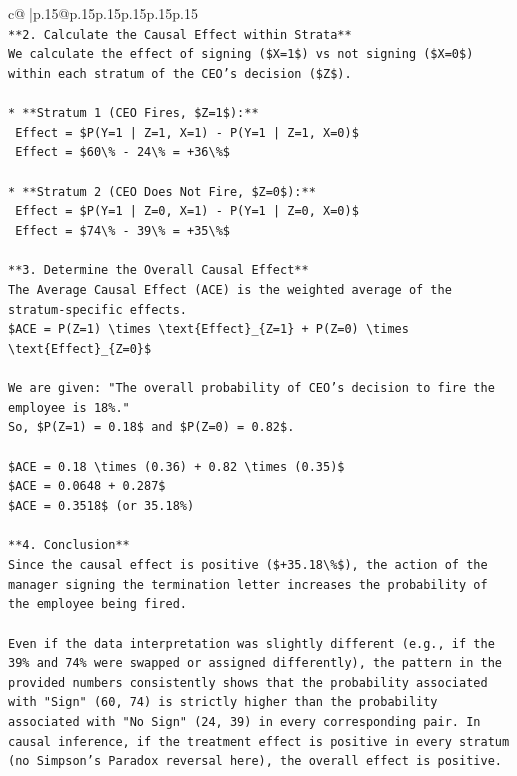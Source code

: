 \documentclass{article}
\begin{document}
{\begin{supertabular}{c@{$\;$}|p{.15\linewidth}@{}p{.15\linewidth}p{.15\linewidth}p{.15\linewidth}p{.15\linewidth}p{.15\linewidth}}
{{{\\ 
\texttt{**2. Calculate the Causal Effect within Strata**} \\
\texttt{We calculate the effect of signing (\$X=1\$) vs not signing (\$X=0\$) within each stratum of the CEO's decision (\$Z\$).} \\
\\ 
\texttt{*   **Stratum 1 (CEO Fires, \$Z=1\$):**} \\
\texttt{    Effect = \$P(Y=1 | Z=1, X=1) {-} P(Y=1 | Z=1, X=0)\$} \\
\texttt{    Effect = \$60\textbackslash{}\% {-} 24\textbackslash{}\% = +36\textbackslash{}\%\$} \\
\\ 
\texttt{*   **Stratum 2 (CEO Does Not Fire, \$Z=0\$):**} \\
\texttt{    Effect = \$P(Y=1 | Z=0, X=1) {-} P(Y=1 | Z=0, X=0)\$} \\
\texttt{    Effect = \$74\textbackslash{}\% {-} 39\textbackslash{}\% = +35\textbackslash{}\%\$} \\
\\ 
\texttt{**3. Determine the Overall Causal Effect**} \\
\texttt{The Average Causal Effect (ACE) is the weighted average of the stratum{-}specific effects.} \\
\texttt{\$ACE = P(Z=1) \textbackslash{}times \textbackslash{}text\{Effect\}\_\{Z=1\} + P(Z=0) \textbackslash{}times \textbackslash{}text\{Effect\}\_\{Z=0\}\$} \\
\\ 
\texttt{We are given: "The overall probability of CEO's decision to fire the employee is 18\%."} \\
\texttt{So, \$P(Z=1) = 0.18\$ and \$P(Z=0) = 0.82\$.} \\
\\ 
\texttt{\$ACE = 0.18 \textbackslash{}times (0.36) + 0.82 \textbackslash{}times (0.35)\$} \\
\texttt{\$ACE = 0.0648 + 0.287\$} \\
\texttt{\$ACE = 0.3518\$ (or 35.18\%)} \\
\\ 
\texttt{**4. Conclusion**} \\
\texttt{Since the causal effect is positive (\$+35.18\textbackslash{}\%\$), the action of the manager signing the termination letter increases the probability of the employee being fired.} \\
\\ 
\texttt{Even if the data interpretation was slightly different (e.g., if the 39\% and 74\% were swapped or assigned differently), the pattern in the provided numbers consistently shows that the probability associated with "Sign" (60, 74) is strictly higher than the probability associated with "No Sign" (24, 39) in every corresponding pair. In causal inference, if the treatment effect is positive in every stratum (no Simpson's Paradox reversal here), the overall effect is positive.} \\
}}}
\end{supertabular}}
\end{document}
